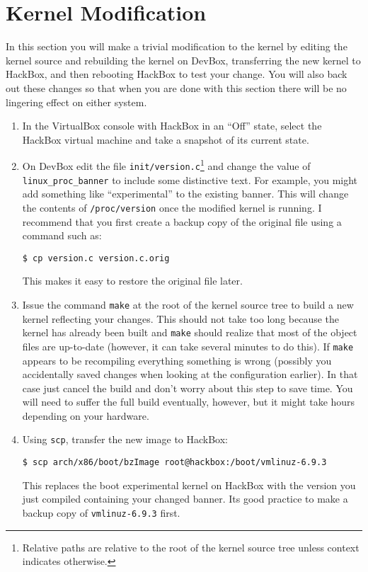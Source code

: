 \documentclass{article}
\newcommand{\command}[1]{\texttt{#1}}
\newcommand{\filename}[1]{\texttt{#1}}
\begin{document}
\section{Kernel Modification}

In this section you will make a trivial modification to the kernel by editing the kernel source
and rebuilding the kernel on DevBox, transferring the new kernel to HackBox, and then rebooting
HackBox to test your change. You will also back out these changes so that when you are done with
this section there will be no lingering effect on either system.

\begin{enumerate}

\item In the VirtualBox console with HackBox in an ``Off'' state, select the HackBox virtual
  machine and take a snapshot of its current state.

\item On DevBox edit the file \filename{init/version.c}\footnote{Relative paths are relative to
    the root of the kernel source tree unless context indicates otherwise.} and change the value
    of \texttt{linux\_proc\_banner} to include some distinctive text. For example, you might add
    something like ``experimental'' to the existing banner. This will change the contents of
    \filename{/proc/version} once the modified kernel is running. I recommend that you first
    create a backup copy of the original file using a command such as:
\begin{verbatim}
$ cp version.c version.c.orig
\end{verbatim}

  This makes it easy to restore the original file later.

\item Issue the command \command{make} at the root of the kernel source tree to build a new
  kernel reflecting your changes. This should not take too long because the kernel has already
  been built and \command{make} should realize that most of the object files are up-to-date
  (however, it can take several minutes to do this). If \command{make} appears to be recompiling
  everything something is wrong (possibly you accidentally saved changes when looking at the
  configuration earlier). In that case just cancel the build and don't worry about this step to
  save time. You will need to suffer the full build eventually, however, but it might take hours
  depending on your hardware.

\item Using \command{scp}, transfer the new image to HackBox:
\begin{Verbatim}
$ scp arch/x86/boot/bzImage root@hackbox:/boot/vmlinuz-6.9.3
\end{Verbatim}
  This replaces the boot experimental kernel on HackBox with the version you just compiled
  containing your changed banner. Its good practice to make a backup copy of
  \filename{vmlinuz-6.9.3} first.


\end{enumerate}
\end{document}
